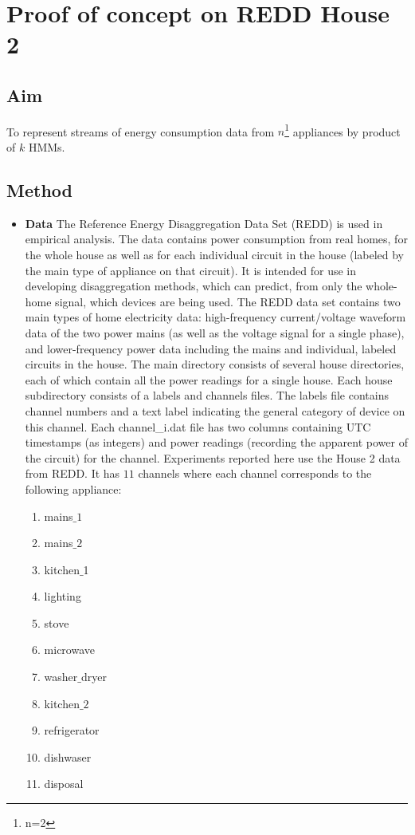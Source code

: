 \documentclass[10pt, conference, compsocconf]{IEEEtran}
\begin{document}
\section{Proof of concept on REDD House 2}
\label{sec:redd}
\subsection{Aim}
 To represent streams of energy consumption data from $n$\footnote{n=2} appliances by product of $k$ HMMs.
 
\subsection{Method} 

\begin{itemize}
\item \textbf{Data } The Reference Energy Disaggregation Data Set (REDD) is used in empirical analysis. The data contains power consumption from real homes, for the whole house as well as for each individual circuit in
the house (labeled by the main type of appliance on that circuit). It is intended for use in developing disaggregation methods, which can predict, from only the whole-home signal, which devices are being used. The REDD data set contains two main types of home electricity data: high-frequency current/voltage waveform data of the two power mains (as well as the voltage signal for a single phase), and lower-frequency power data including the mains and individual, labeled circuits in the house. The main directory consists of several house directories, each of which contain all the power readings for a single house.  Each house subdirectory consists of a labels and channels files. The labels file contains channel numbers and a text label indicating the general category of device on this channel. Each channel\_i.dat file has two columns containing UTC timestamps (as integers) and power readings (recording the apparent power of the circuit) for the channel.
Experiments reported here use the House 2 data from REDD. It has $11$ channels where each channel corresponds to the following appliance: 
\begin{enumerate}
\item mains$\_1$ 
\item mains$\_2$ 
\item kitchen$\_$1
\item lighting
\item stove 
\item microwave
\item washer$\_$dryer
\item kitchen$\_2$
\item refrigerator
\item dishwaser
\item disposal
\end{enumerate}


\end{itemize}
\end{document}
